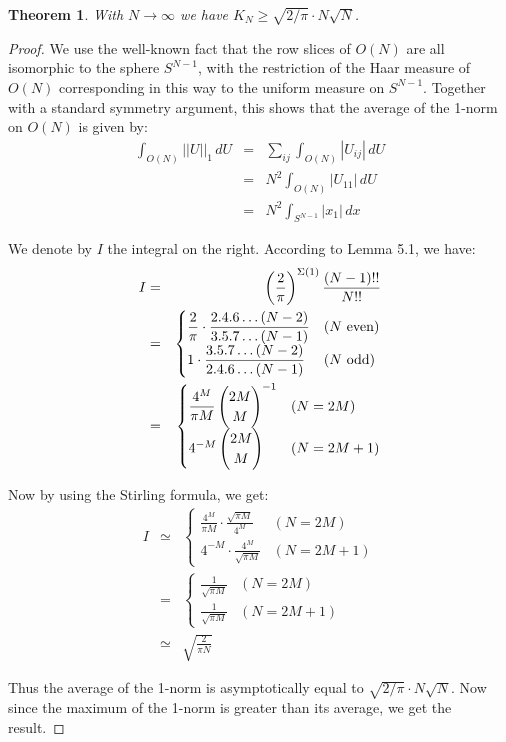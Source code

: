 \documentclass[12pt]{amsart}
\newtheorem{theorem}{Theorem}[section]
\begin{document}
\begin{theorem}
With $N\to\infty$ we have $K_N\geq\sqrt{2/\pi}\cdot N\sqrt{N}$.
\end{theorem}

\begin{proof}
We use the well-known fact that the row slices of $O(N)$ are all isomorphic to the sphere $S^{N-1}$, with the restriction of the Haar measure of $O(N)$ corresponding in this way to the uniform measure on $S^{N-1}$. Together with a standard symmetry argument, this shows that the average of the 1-norm on $O(N)$ is given by:
\begin{eqnarray*}
\int_{O(N)}||U||_1\,dU
&=&\sum_{ij}\int_{O(N)}|U_{ij}|\,dU\\
&=&N^2\int_{O(N)}|U_{11}|\,dU\\
&=&N^2\int_{S^{N-1}}|x_1|\,dx
\end{eqnarray*}

We denote by $I$ the integral on the right. According to Lemma 5.1, we have:
\begin{eqnarray*}
I
&=&\left(\frac{2}{\pi}\right)^{\Sigma(1)}\frac{(N-1)!!}{N!!}\\
&=&\begin{cases}
\displaystyle{\frac{2}{\pi}\cdot\frac{2.4.6\ldots(N-2)}{3.5.7\ldots(N-1)}}& (N\ {\rm even})\\
\displaystyle{1\cdot\frac{3.5.7\ldots(N-2)}{2.4.6\ldots(N-1)}}& (N\ {\rm odd})
\end{cases}\\
&=&
\begin{cases}
\displaystyle{\frac{4^M}{\pi M}}\begin{pmatrix}2M\\ M\end{pmatrix}^{-1}& (N=2M)\\
4^{-M}\begin{pmatrix}2M\\ M\end{pmatrix}& (N=2M+1)
\end{cases}
\end{eqnarray*}

Now by using the Stirling formula, we get:
\begin{eqnarray*}
I
&\simeq&\begin{cases}
\displaystyle{\frac{4^M}{\pi M}\cdot\frac{\sqrt{\pi M}}{4^M}}& (N=2M)\\
\displaystyle{4^{-M}\cdot\frac{4^M}{\sqrt{\pi M}}}& (N=2M+1)
\end{cases}\\
&=&\begin{cases}
\displaystyle{\frac{1}{\sqrt{\pi M}}}& (N=2M)\\
\displaystyle{\frac{1}{\sqrt{\pi M}}}& (N=2M+1)
\end{cases}\\
&\simeq&\sqrt{\frac{2}{\pi N}}
\end{eqnarray*}

Thus the average of the 1-norm is asymptotically equal to $\sqrt{2/\pi}\cdot N\sqrt{N}$. Now since the maximum of the 1-norm is greater than its average, we get the result.
\end{proof}
\end{document}
